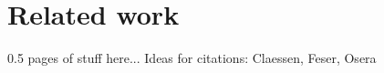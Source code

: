 \section{Related work}
\label{sec:related}

0.5 pages of stuff here... Ideas for citations: Claessen, Feser, Osera
